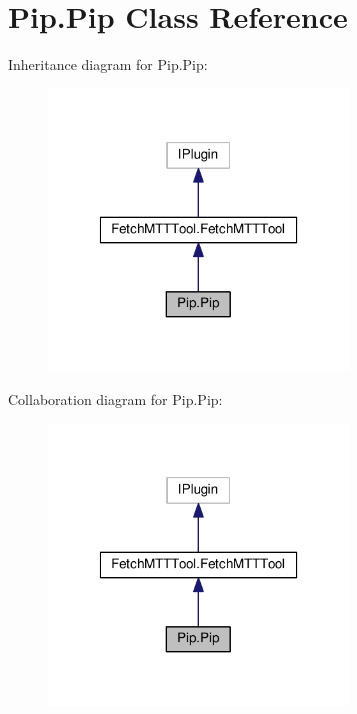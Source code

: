 \hypertarget{class_pip_1_1_pip}{\section{Pip.\-Pip Class Reference}
\label{class_pip_1_1_pip}
}


Inheritance diagram for Pip.\-Pip\-:
\nopagebreak
\begin{figure}[H]
\begin{center}
\leavevmode
\includegraphics[width=226pt]{class_pip_1_1_pip__inherit__graph}
\end{center}
\end{figure}


Collaboration diagram for Pip.\-Pip\-:
\nopagebreak
\begin{figure}[H]
\begin{center}
\leavevmode
\includegraphics[width=226pt]{class_pip_1_1_pip__coll__graph}
\end{center}
\end{figure}
